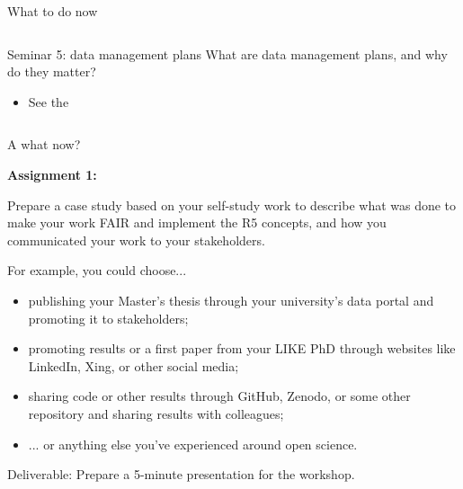 \begin{frame}{What to do now}
\begin{columns}[t]
\begin{column}{.45\textwidth}
		\begin{block}{Seminar 5: data management plans}
			What are data management plans, and why do they matter?
			\begin{itemize}
				\item See the 
			\end{itemize}
		\end{block}
		\end{column}

	\end{columns}

\end{frame}


\begin{frame}{A what now?}

    \textbf{Assignment 1:}
    
	Prepare a case study based on your self-study work to describe what was done to make your work FAIR and implement the R5 concepts, and how you communicated your work to your stakeholders. 
	
	For example, you could choose...
    
    \begin{itemize}
        \item publishing your Master’s thesis through your university’s data portal and promoting it to stakeholders;
        \item promoting results or a first paper from your LIKE PhD through websites like LinkedIn, Xing, or other social media;
        \item sharing code or other results through GitHub, Zenodo, or some other repository and sharing results with colleagues;
        \item ... or anything else you've experienced around open science.
    \end{itemize}
    
    Deliverable: Prepare a 5-minute presentation for the workshop.


\end{frame}

